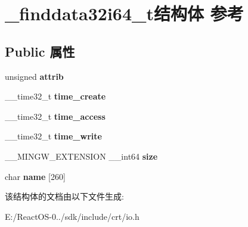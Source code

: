 \hypertarget{struct__finddata32i64__t}{}\section{\+\_\+finddata32i64\+\_\+t结构体 参考}
\label{struct__finddata32i64__t}
\subsection*{Public 属性}
\begin{DoxyCompactItemize}
\item 
\mbox{\label{struct__finddata32i64__t_aa55d201d0e72510a4eeb85a1c9af8947}} 
unsigned {\bfseries attrib}
\item 
\mbox{\label{struct__finddata32i64__t_a11990a81341faa67bc055be7a179447b}} 
\+\_\+\+\_\+time32\+\_\+t {\bfseries time\+\_\+create}
\item 
\mbox{\label{struct__finddata32i64__t_a7021536e0acb212240b5696e44796228}} 
\+\_\+\+\_\+time32\+\_\+t {\bfseries time\+\_\+access}
\item 
\mbox{\label{struct__finddata32i64__t_af29f4bf3e667f6aecf557ed243567a3a}} 
\+\_\+\+\_\+time32\+\_\+t {\bfseries time\+\_\+write}
\item 
\mbox{\label{struct__finddata32i64__t_a3cb485ff9b5111f4769cf2a7ef1abc35}} 
\+\_\+\+\_\+\+M\+I\+N\+G\+W\+\_\+\+E\+X\+T\+E\+N\+S\+I\+ON \+\_\+\+\_\+int64 {\bfseries size}
\item 
\mbox{\label{struct__finddata32i64__t_a9278629aada54465bd04968c94671832}} 
char {\bfseries name} \mbox{[}260\mbox{]}
\end{DoxyCompactItemize}


该结构体的文档由以下文件生成\+:\begin{DoxyCompactItemize}
\item 
E\+:/\+React\+O\+S-\/0../sdk/include/crt/io.\+h\end{DoxyCompactItemize}

